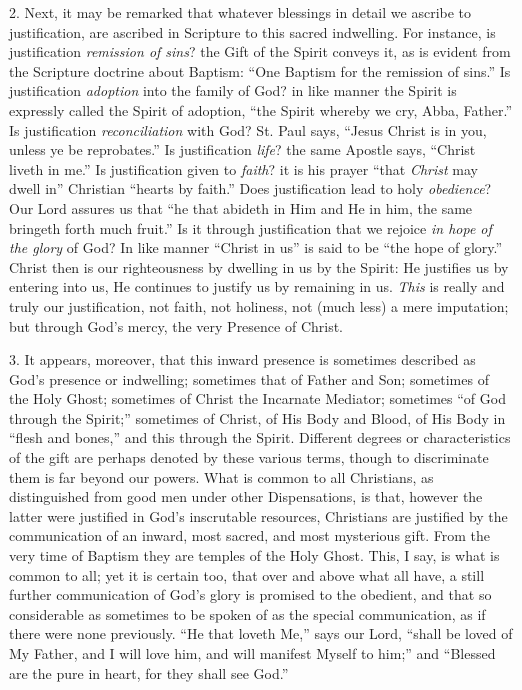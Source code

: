 2. Next, it may be remarked that whatever blessings in detail we
ascribe to justification, are ascribed in Scripture to this sacred
indwelling. For instance, is justification \emph{remission of sins}?
the Gift of the Spirit conveys it, as is evident from the Scripture
doctrine about Baptism: ``One Baptism for the remission of
sins.'' Is justification \emph{adoption} into the family of God?
in like manner the Spirit is expressly called the Spirit of
adoption, ``the Spirit whereby we cry, Abba, Father.'' Is
justification \emph{reconciliation} with God? St. Paul says,
``Jesus Christ is in you, unless ye be reprobates.'' Is
justification \emph{life}? the same Apostle says, ``Christ liveth
in me.'' Is justification given to \emph{faith}? it is his prayer
``that \emph{Christ} may dwell in'' Christian ``hearts by
faith.'' Does justification lead to holy \emph{obedience}? Our
Lord assures us that ``he that abideth in Him and He in him, the
same bringeth forth much fruit.'' Is it through justification that
we rejoice \emph{in hope of the glory} of God? In like manner
``Christ in us'' is said to be ``the hope of glory.''
Christ then is our righteousness by dwelling in us by the Spirit: He
justifies us by entering into us, He continues to justify us by
remaining in us. \emph{This} is really and truly our justification,
not faith, not holiness, not (much less) a mere imputation; but
through God's mercy, the very Presence of Christ.

3. It appears, moreover, that this inward presence is sometimes
described as God's presence or indwelling; sometimes that of Father
and Son; sometimes of the Holy Ghost; sometimes of Christ the
Incarnate Mediator; sometimes ``of God through the Spirit;''
sometimes of Christ, of His Body and Blood, of His Body in ``flesh
and bones,'' and this through the Spirit. Different degrees or
characteristics of the gift are perhaps denoted by these various
terms, though to discriminate them is far beyond our powers. What is
common to all Christians, as distinguished from good men under other
Dispensations, is that, however the latter were justified in God's
inscrutable resources, Christians are justified by the communication of an inward, most sacred, and most mysterious gift.
From the very time of Baptism they are temples of the Holy Ghost.
This, I say, is what is common to all; yet it is certain too, that
over and above what all have, a still further communication of God's
glory is promised to the obedient, and that so considerable as
sometimes to be spoken of as the special communication, as if there
were none previously. ``He that loveth Me,'' says our Lord,
``shall be loved of My Father, and I will love him, and will
manifest Myself to him;'' and ``Blessed are the pure in heart,
for they shall see God.''

